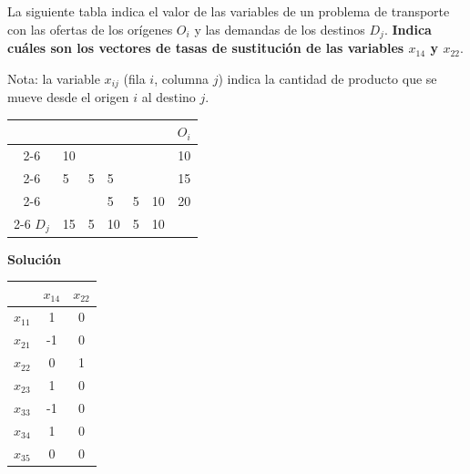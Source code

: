 La siguiente tabla indica el valor de las variables de un problema de transporte con las ofertas de los orígenes $O_i$ y las demandas de los destinos $D_j$. \textbf{Indica cuáles son los vectores de tasas de sustitución de las variables $x_{14}$ y $x_{22}$}.

Nota: la variable $x_{ij}$ (fila $i$, columna $j$) indica la cantidad de producto que se mueve desde el origen $i$ al destino $j$.

\begin{table}[h]
\begin{center}

\begin{tabular}{ccccccc}
                      &                         &                        &                        &                        &                         & $O_i$ \\ \cline{2-6}
\multicolumn{1}{l|}{} & \multicolumn{1}{l|}{10} & \multicolumn{1}{l|}{}  & \multicolumn{1}{l|}{}  & \multicolumn{1}{l|}{}  & \multicolumn{1}{l|}{}   & 10    \\ \cline{2-6}
\multicolumn{1}{l|}{} & \multicolumn{1}{l|}{5}  & \multicolumn{1}{l|}{5} & \multicolumn{1}{l|}{5} & \multicolumn{1}{l|}{}  & \multicolumn{1}{l|}{}   & 15    \\ \cline{2-6}
\multicolumn{1}{l|}{} & \multicolumn{1}{l|}{}   & \multicolumn{1}{l|}{}  & \multicolumn{1}{l|}{5} & \multicolumn{1}{l|}{5} & \multicolumn{1}{l|}{10} & 20    \\ \cline{2-6}
$D_j$                 & 15                      & 5                      & 10                     & 5                      & 10                      &      
\end{tabular}
    
\end{center}
\end{table}

\textbf{Solución}
\vspace{0.5cm}

\begin{tabular}{|l|c|c|}
\hline
 & $x_{14}$ & $x_{22}$ \\
\hline
$x_{11}$ & 1 & 0 \\
$x_{21}$ & -1 & 0 \\
$x_{22}$ & 0 & 1 \\
$x_{23}$ & 1 & 0 \\
$x_{33}$ & -1 & 0 \\
$x_{34}$ & 1 & 0 \\
$x_{35}$ & 0 & 0 \\
\hline
\end{tabular}

